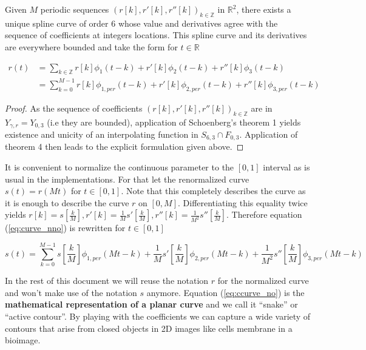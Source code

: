 \documentclass[a4paper, 11pt]{article}
\begin{document}
\begin{cor}{3}
  Given $M$ periodic sequences  ${(r[k], r'[k], r''[k])}_{k \in \mathbb{Z}}$ in $\mathbb{R}^2$, there exists a unique 
  spline curve of order $6$ whose value and derivatives agree with the sequence of coefficients at integers locations.  
  This spline curve and its derivatives are everywhere bounded and take the form for $t \in \mathbb{R}$

\begin{align}
  r(t) &= \sum_{k \in \mathbb{Z}} r[k] \phi_1(t-k) + r'[k] \phi_2(t-k) + r''[k] \phi_3(t-k) \\
  &= \sum_{k=0}^{M-1} r[k] \phi_{1, per}(t-k) + r'[k] \phi_{2, per}(t-k) + r''[k] \phi_{3, per}(t-k) 
  \label{eq:curve_nno}
\end{align}

\end{cor}

\begin{proof}
As the sequence of coefficients ${(r[k], r'[k], r''[k])}_{k \in \mathbb{Z}}$  are in $Y_{\gamma, r} = Y_{0, 3}$ (i.e 
they are bounded), application of Schoenberg's theorem 1 yields existence and unicity of an interpolating function in 
$S_{6,3} \cap F_{0, 3}$. Application of theorem 4 then leads to the explicit formulation given above.
\end{proof}

\begin{remark}{1} It is convenient to normalize the continuous parameter to the $[0,1]$ interval as is usual in the 
  implementations.  For that let the renormalized curve $s(t) = r(Mt)$ for $t \in [0,1]$. Note that this completely 
  describes the curve as it is enough to describe the curve $r$ on $[0,M]$. Differentiating this equality twice yields 
  $r[k] = s[\frac{k}{M}], r'[k] = \frac{1}{M} s'[\frac{k}{M}], r''[k] = \frac{1}{M^2} s''[\frac{k}{M}]$. Therefore 
  equation (\ref{eq:curve_nno}) is rewritten for $t \in [0,1]$

\begin{equation}
  \label{eq:ccurve_no}
  s(t) = \sum_{k=0}^{M-1} s[\frac{k}{M}] \phi_{1, per}(Mt-k) + \frac{1}{M} s'[\frac{k}{M}] \phi_{2, per}(Mt-k) + 
  \frac{1}{M^2} s''[\frac{k}{M}] \phi_{3, per}(Mt-k)
\end{equation}

\end{remark}

In the rest of this document we will reuse the notation $r$ for the normalized curve and won't make use of the notation 
$s$ anymore. Equation (\ref{eq:ccurve_no}) is the \textbf{mathematical representation of a planar curve} and we call it 
“snake” or “active contour”. By playing with the coefficients we can capture a wide variety of contours that arise from 
closed objects in 2D images like cells membrane in a bioimage. 
\end{document}

